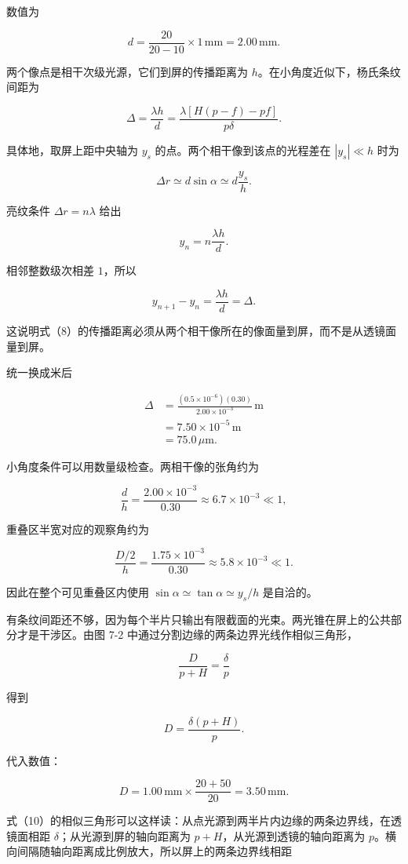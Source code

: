 \documentclass[12pt,a4paper,UTF8]{ctexart}
\begin{document}
数值为

\[
d=\frac{20}{20-10}\times1\,\mathrm{mm}
=2.00\,\mathrm{mm}.
\tag{7}
\]

两个像点是相干次级光源，它们到屏的传播距离为
\(h\)。在小角度近似下，杨氏条纹间距为

\[
\Delta=\frac{\lambda h}{d}
=\frac{\lambda[H(p-f)-pf]}{p\delta}.
\tag{8}
\]

具体地，取屏上距中央轴为 \(y_s\) 的点。两个相干像到该点的光程差在
\(|y_s|\ll h\) 时为

\[
\Delta r\simeq d\sin\alpha
\simeq d\frac{y_s}{h}.
\]

亮纹条件 \(\Delta r=n\lambda\) 给出

\[
y_n=n\frac{\lambda h}{d}.
\]

相邻整数级次相差 \(1\)，所以

\[
y_{n+1}-y_n=\frac{\lambda h}{d}=\Delta.
\]

这说明式（8）的传播距离必须从两个相干像所在的像面量到屏，而不是从透镜面量到屏。

统一换成米后

\[
\begin{aligned}
\Delta
&=\frac{(0.5\times10^{-6})(0.30)}{2.00\times10^{-3}}\,\mathrm m\\
&=7.50\times10^{-5}\,\mathrm m\\
&=75.0\,\mu\mathrm m.
\end{aligned}
\tag{9}
\]

小角度条件可以用数量级检查。两相干像的张角约为

\[
\frac dh=\frac{2.00\times10^{-3}}{0.30}
\approx6.7\times10^{-3}\ll1,
\]

重叠区半宽对应的观察角约为

\[
\frac{D/2}{h}
=\frac{1.75\times10^{-3}}{0.30}
\approx5.8\times10^{-3}\ll1.
\]

因此在整个可见重叠区内使用 \(\sin\alpha\simeq\tan\alpha\simeq y_s/h\)
是自洽的。

有条纹间距还不够，因为每个半片只输出有限截面的光束。两光锥在屏上的公共部分才是干涉区。由图
7-2 中通过分割边缘的两条边界光线作相似三角形，

\[
\frac{D}{p+H}=\frac{\delta}{p}
\tag{10}
\]

得到

\[
D=\frac{\delta(p+H)}p.
\tag{11}
\]

代入数值：

\[
D=1.00\,\mathrm{mm}\times\frac{20+50}{20}
=3.50\,\mathrm{mm}.
\tag{12}
\]

式（10）的相似三角形可以这样读：从点光源到两半片内边缘的两条边界线，在透镜面相距
\(\delta\)；从光源到屏的轴向距离为 \(p+H\)，从光源到透镜的轴向距离为
\(p\)。横向间隔随轴向距离成比例放大，所以屏上的两条边界线相距
\end{document}
